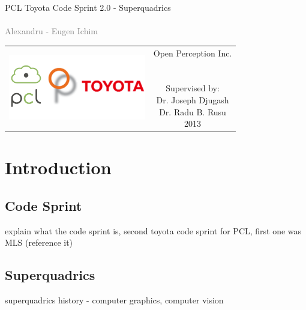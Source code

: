 \documentclass{article}
\begin{document}
\begin{titlepage}
\begin{center}
\sffamily


\null\vspace{2cm}
{\huge PCL Toyota Code Sprint 2.0 - Superquadrics} \\[24pt] 
\textcolor{gray}{{\\ Alexandru - Eugen Ichim}}
    
\vfill

\begin{tabular} {cc}
\hspace{1cm}
\parbox{0.4\textwidth}{\includegraphics[width=6cm]{figures/logos}}
\hspace{4cm}
&
\parbox{0.7\textwidth}{%
	Open Perception Inc. \\ \\ \\
%
\small
Supervised by:\\[4pt]
%
    Dr. Joseph Djugash\\
    Dr. Radu B. Rusu\\[12pt]
%
2013}
\end{tabular}
\end{center}
\vspace{2cm}
\end{titlepage}



\tableofcontents
\newpage

\section {Introduction}

\subsection {Code Sprint}
explain what the code sprint is, second toyota code sprint for PCL, first one was MLS (reference it)


\subsection {Superquadrics}
superquadrics history - computer graphics, computer vision
\end{document}
